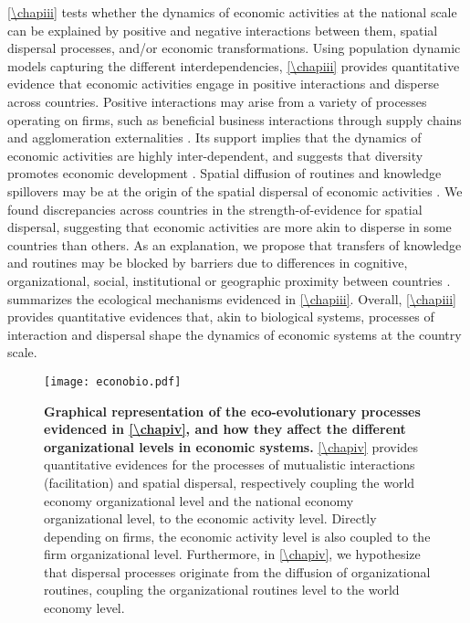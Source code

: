 \cref{\chapiii} tests whether the dynamics of economic activities at the national scale can be explained by positive and negative interactions between them, spatial dispersal processes, and/or economic transformations.
% 
Using population dynamic models capturing the different interdependencies, \cref{\chapiii} provides quantitative evidence that economic activities engage in positive interactions and disperse across countries.
% 
Positive interactions may arise from a variety of processes operating on firms, such as beneficial business interactions through supply chains \citep{Ozman2009,Saavedra2009a} and agglomeration externalities \citep{VanDerPanne2004}. 
% 
Its support implies that the dynamics of economic activities are highly inter-dependent, and suggests that diversity promotes economic development \citep{Hidalgo2018}.
% 
Spatial diffusion of routines \citep{Hodgson2004} and knowledge spillovers \citep{Caragliu2016} may be at the origin of the spatial dispersal of economic activities \citep{Zahra2000,RogersEverettM2003DoI,Boschma2008}. We found discrepancies across countries in the strength-of-evidence for spatial dispersal, suggesting that economic activities are more akin to disperse in some countries than others. As an explanation, we propose that transfers of knowledge and routines may be blocked by barriers due to differences in cognitive, organizational, social, institutional or geographic proximity between countries \citep{Boschma2005,Caragliu2016}.
% 
 summarizes the ecological mechanisms evidenced in \cref{\chapiii}. Overall, \cref{\chapiii} provides quantitative evidences that, akin to biological systems, processes of interaction and dispersal shape the dynamics of economic systems at the country scale.

\begin{figure}[t]
    \centering
    \texttt{[image: econobio.pdf]}
    \caption{\textbf{Graphical representation of the eco-evolutionary processes evidenced in \cref{\chapiv}, and how they affect the different organizational levels in economic systems.} \cref{\chapiv} provides quantitative evidences for the processes of mutualistic interactions (facilitation) and spatial dispersal, respectively coupling the world economy organizational level and the national economy organizational level, to the economic activity level. Directly depending on firms, the economic activity level is also coupled to the firm organizational level. Furthermore, in \cref{\chapiv}, we hypothesize that dispersal processes originate from the diffusion of organizational routines, coupling the organizational routines level to the world economy level.}
    \label{fig:summary_econobio}
\end{figure}

